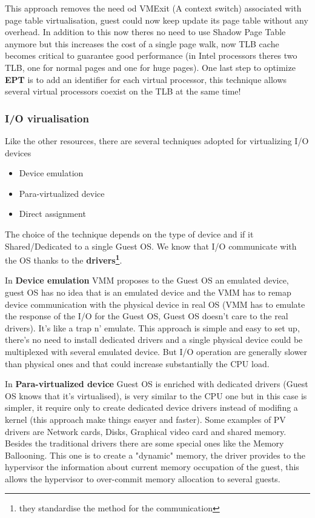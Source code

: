 This approach removes the need od VMExit (A context switch) associated with page table virtualisation, guest could now keep update its page table without any overhead. In addition to this now theres no need to use Shadow Page Table anymore but this increases the cost of a single page walk, now TLB cache becomes critical to guarantee good performance (in Intel processors theres two TLB, one for normal pages and one for huge pages). One last step to optimize \textbf{EPT} is to add an identifier for each virtual processor, this technique allows several virtual processors coexist on the TLB at the same time!
\subsubsection{I/O virualisation}
Like the other resources, there are several techniques adopted for virtualizing I/O devices
\begin{itemize}
    \item Device emulation
    \item Para-virtualized device
    \item Direct assignment
\end{itemize}
The choice of the technique depends on the type of device and if it Shared/Dedicated to a single Guest OS. We know that I/O communicate with the OS thanks to the \textbf{drivers\footnote{they standardise the method for the communication}}.

In \textbf{Device emulation} VMM proposes to the Guest OS an emulated device, guest OS has no idea that is an emulated device and the VMM has to remap device communication with the physical device in real OS (VMM has to emulate the response of the I/O for the Guest OS, Guest OS doesn't care to the real drivers).
It's like a trap n' emulate.
This approach is simple and easy to set up, there's no need to install dedicated drivers and a single physical device could be multiplexed with several emulated device. But I/O operation are generally slower than physical ones and that could increase substantially the CPU load.

In \textbf{Para-virtualized device} Guest OS is enriched with dedicated drivers (Guest OS knows that it's virtualised), is very similar to the CPU one but in this case is simpler, it require only to create dedicated device drivers instead of modifing a kernel (this approach make things easyer and faster). Some examples of PV drivers are Network cards, Disks, Graphical video card and shared memory. Besides the traditional drivers there are some special ones like the Memory Ballooning. This one is to create a "dynamic" memory, the driver provides to the hypervisor the information about current memory occupation of the guest, this allows the hypervisor to over-commit memory allocation to several guests.


